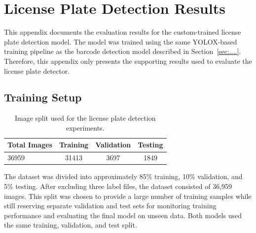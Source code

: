 
\section{License Plate Detection Results}
\label{app:license_plate_results}

This appendix documents the evaluation results for the custom-trained license
plate detection model. The model was trained using the same YOLOX-based
training pipeline as the barcode detection model described in
Section~\ref{sec:....}. Therefore, this appendix only
presents the supporting results used to evaluate the license plate detector.


\subsection{Training Setup}

\begin{table}[H]
\centering
\begin{tabular}{lccc}
\toprule
Total Images & Training & Validation & Testing \\
\midrule
36959 & 31413 & 3697 & 1849 \\
\bottomrule
\end{tabular}
\caption{Image split used for the license plate detection experiments.}
\label{tab:license_plate_training_split}
\end{table}

The dataset was divided into approximately 85\% training, 10\% validation, and
5\% testing. After excluding three label files, the dataset consisted of 36,959 images. This split was chosen to provide a large number of training
samples while still reserving separate validation and test sets for monitoring
training performance and evaluating the final model on unseen data. Both models
used the same training, validation, and test split.



